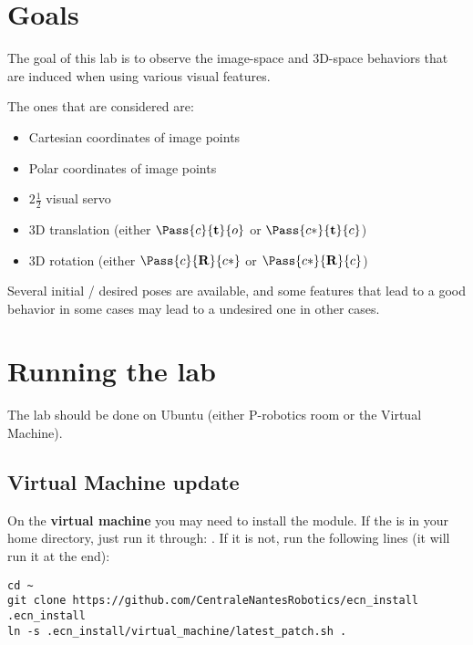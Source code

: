 \documentclass{ecnreport}
\author{O. Kermorgant}
\begin{document}


\section{Goals}

The goal of this lab is to observe the image-space and 3D-space behaviors that are induced when using various visual features.

The ones that are considered are:
\begin{itemize}
 \item Cartesian coordinates of image points
 \item Polar coordinates of image points
 \item $2\frac{1}{2}$ visual servo
 \item 3D translation (either $\Pass{c}{\mathbf{t}}{o}$ or $\Pass{c*}{\mathbf{t}}{c}$)
 \item 3D rotation (either $\Pass{c}{\mathbf{R}}{c*}$ or $\Pass{c*}{\mathbf{R}}{c}$)
\end{itemize}

Several initial / desired poses are available, and some features that lead to a good behavior in some cases may lead to a undesired one in other cases.

\section{Running the lab}

The lab should be done on Ubuntu (either P-robotics room or the Virtual Machine).\\

\subsection{Virtual Machine update}
On the \textbf{virtual machine} you may need to install the  module. If the  is in your home directory, just run it through: . If it is not, run the following lines (it will run it at the end):
\begin{center}\bashstyle
 \begin{lstlisting}
cd ~
git clone https://github.com/CentraleNantesRobotics/ecn_install .ecn_install
ln -s .ecn_install/virtual_machine/latest_patch.sh . 
\end{lstlisting}
\end{center}
\end{document}
